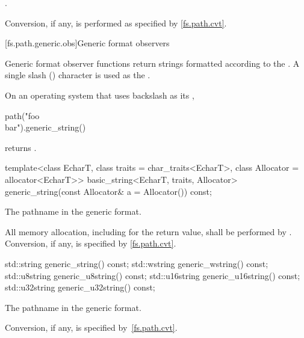 \begin{itemdescr}
\pnum
\returns
{}.

\pnum
\remarks
Conversion, if any, is performed as specified
by \ref{fs.path.cvt}.
\end{itemdescr}


[fs.path.generic.obs]{Generic format observers}

\pnum
Generic format observer functions return strings formatted according to the
.
A single slash () character is used as
the .

\pnum
\begin{example}
On an operating system that uses backslash as
its ,
\begin{codeblock}
path("foo\\bar").generic_string()
\end{codeblock}
returns .
\end{example}

%
\begin{itemdecl}
template<class EcharT, class traits = char_traits<EcharT>,
         class Allocator = allocator<EcharT>>
  basic_string<EcharT, traits, Allocator>
    generic_string(const Allocator& a = Allocator()) const;
\end{itemdecl}

\begin{itemdescr}
\pnum
\returns
The pathname in the generic format.

\pnum
\remarks
All memory allocation, including for the return value, shall
be performed by . Conversion, if any, is specified by
\ref{fs.path.cvt}.
\end{itemdescr}

%
%
%
%
%
\begin{itemdecl}
std::string generic_string() const;
std::wstring generic_wstring() const;
std::u8string generic_u8string() const;
std::u16string generic_u16string() const;
std::u32string generic_u32string() const;
\end{itemdecl}

\begin{itemdescr}
\pnum
\returns
The pathname in the generic format.

\pnum
\remarks
Conversion, if any, is specified by~\ref{fs.path.cvt}.
\end{itemdescr}

